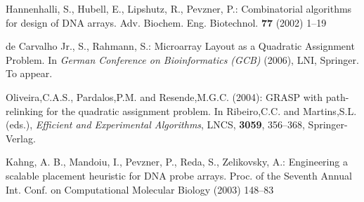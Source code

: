 \documentclass[portrait]{a0poster}
\begin{document}
\begin{multicols}{3}[\aggiheader]
\begin{thebibliography}{9}

 Hannenhalli, S., Hubell, E., Lipshutz, R., Pevzner, P.:
Combinatorial algorithms for design of DNA arrays.
Adv. Biochem. Eng. Biotechnol. {\bfseries77} (2002) 1--19

de Carvalho Jr., S., Rahmann, S.:
Microarray Layout as a Quadratic Assignment Problem.
In {\it German Conference on Bioinformatics (GCB)} (2006), LNI, Springer. To appear.

 Oliveira,C.A.S., Pardalos,P.M. and Resende,M.G.C. (2004):
GRASP with path-relinking for the quadratic assignment
problem. In Ribeiro,C.C. and Martins,S.L. (eds.), {\it Efficient and
Experimental Algorithms}, LNCS, {\bf 3059},
356--368, Springer-Verlag.

 Kahng, A. B., Mandoiu, I., Pevzner, P., Reda, S., Zelikovsky, A.:
Engineering a scalable placement heuristic for DNA probe arrays.
Proc. of the Seventh Annual Int. Conf. on Computational Molecular Biology (2003) 148--83

\end{thebibliography}

\end{multicols}

\aggifooter

\end{document}
